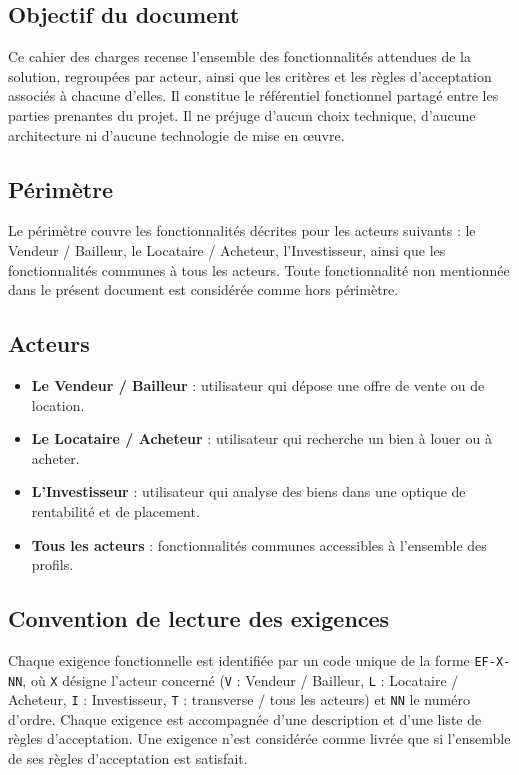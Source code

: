 \documentclass[11pt,a4paper]{article}
\begin{document}
\subsection{Objectif du document}
Ce cahier des charges recense l'ensemble des fonctionnalités attendues de la
solution, regroupées par acteur, ainsi que les critères et les règles
d'acceptation associés à chacune d'elles. Il constitue le référentiel
fonctionnel partagé entre les parties prenantes du projet. Il ne préjuge
d'aucun choix technique, d'aucune architecture ni d'aucune technologie de
mise en œuvre.

\subsection{Périmètre}
Le périmètre couvre les fonctionnalités décrites pour les acteurs suivants :
le Vendeur / Bailleur, le Locataire / Acheteur, l'Investisseur, ainsi que les
fonctionnalités communes à tous les acteurs. Toute fonctionnalité non
mentionnée dans le présent document est considérée comme hors périmètre.

\subsection{Acteurs}
\begin{itemize}[leftmargin=1.4em]
  \item \textbf{Le Vendeur / Bailleur} : utilisateur qui dépose une offre de vente ou de location.
  \item \textbf{Le Locataire / Acheteur} : utilisateur qui recherche un bien à louer ou à acheter.
  \item \textbf{L'Investisseur} : utilisateur qui analyse des biens dans une optique de rentabilité et de placement.
  \item \textbf{Tous les acteurs} : fonctionnalités communes accessibles à l'ensemble des profils.
\end{itemize}

\subsection{Convention de lecture des exigences}
Chaque exigence fonctionnelle est identifiée par un code unique de la forme
\texttt{EF-X-NN}, où \texttt{X} désigne l'acteur concerné
(\texttt{V} : Vendeur / Bailleur, \texttt{L} : Locataire / Acheteur,
\texttt{I} : Investisseur, \texttt{T} : transverse / tous les acteurs) et
\texttt{NN} le numéro d'ordre. Chaque exigence est accompagnée d'une
description et d'une liste de règles d'acceptation. Une exigence n'est
considérée comme livrée que si l'ensemble de ses règles d'acceptation est
satisfait.
\end{document}
